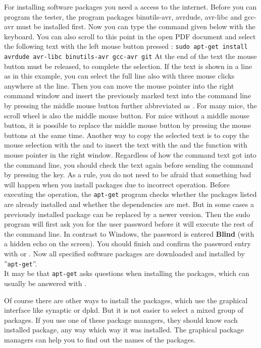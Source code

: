 For installing software packages you need a access to the internet.
Before you can program the tester, the program packages
binutils-avr, avrdude, avr-libc and gcc-avr must be installed first.
Now you can type the command given below with the keyboard.
You can also scroll to this point in the open PDF document and select the
following text with the left mouse button pressed \LMB :
\large{\newline\verb"sudo apt-get install avrdude avr-libc binutils-avr gcc-avr git"\newline}
At the end of the text the mouse button \LMB must be released,
to complete the selection.
If the text is shown in a line as in this example, you can select the full line also
with three \LMB mouse clicks anywhere at the line.
Then you can move the mouse pointer into the right command window and
insert the previously marked text into the command line by pressing the
middle mouse button {further abbreviated as \MMB }.
For many mice, the scroll wheel is also the middle mouse button.
For mice without a middle mouse button, it is possible to replace the middle mouse button
by pressing the \LRMB mouse buttons at the same time.
Another way to copy the selected text is to copy the mouse selection with the
 and to insert the text with the \RMB and the function 
 with mouse pointer in the right window.
Regardless of how the command text got into the command line,
you should check the text again before sending the command by pressing the \keys{\enter} key.
As a rule, you do not need to be afraid that something bad will happen when you install packages
due to incorrect operation.
Before executing the operation, the \verb"apt-get" program checks whether the packages listed
are already installed and whether the dependencies are met.
But in some cases a previously installed package can be replaced by a newer version.
Then the sudo program will first ask you for the user password before it
will execute the rest of the command line.
In contrast to Windows, the password is entered \textbf{Blind} (with a hidden echo on the screen).
You should finish and confirm the password entry with \keys{\enter} or \keys{\return}. 
Now all specified software packages are downloaded and installed by ''\verb"apt-get"''.\\

It may be that \verb"apt-get" asks questions when installing the packages,
which can usually be answered with .

Of course there are other ways to install the packages, which use the graphical interface
like synaptic or dpkd. But it is not easier to select a mixed group of packages.
If you use one of these package managers, they should know each installed package,
any way which way it was installed.
The graphical package managers can help you to find out the names of the packages.


